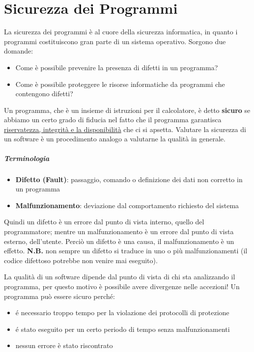 \chapter{Sicurezza dei Programmi}
La sicurezza dei programmi è al cuore della sicurezza informatica, in quanto i programmi costituiscono gran parte di un sistema operativo. Sorgono due domande:
\begin{itemize}
\item Come è possibile prevenire la presenza di difetti in un programma?
\item Come è possibile proteggere le risorse informatiche da programmi che contengono difetti?
\end{itemize}

Un programma, che è un insieme di istruzioni per il calcolatore, è detto \textbf{sicuro} se abbiamo un certo grado di fiducia nel fatto che il programma garantisca \underline{riservatezza, integrità e la disponibilità} che ci si apsetta.
Valutare la sicurezza di un software è un procedimento analogo a valutarne la qualità in generale.
\paragraph{Terminologia}
\begin{itemize}
\item \textbf{Difetto (Fault)}: passaggio, comando o definizione dei dati non corretto in un programma
\item \textbf{Malfunzionamento}: deviazione dal comportamento richiesto del sistema
\end{itemize}

Quindi un difetto è un errore dal punto di vista interno, quello del programmatore; mentre un malfunzionamento è un errore dal punto di vista esterno, dell'utente. Perciò un difetto è una causa, il malfunzionamento è un effetto.
\textbf{N.B.} non sempre un difetto si traduce in uno o più malfunzionamenti (il codice difettoso potrebbe non venire mai eseguito).

La qualità di un software dipende dal punto di vista di chi sta analizzando il programma, per questo motivo è possibile avere divergenze nelle accezioni! Un programma può essere sicuro perché:

\begin{itemize}
\item é necessario troppo tempo per la violazione dei protocolli di protezione
\item é stato eseguito per un certo periodo di tempo senza malfunzionamenti 
\item nessun errore è stato riscontrato
\end{itemize}

